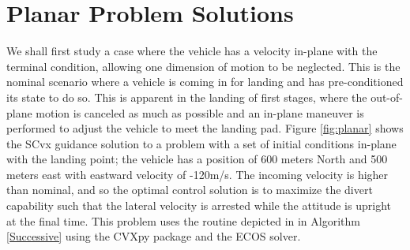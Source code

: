 \documentclass[conf]{new-aiaa}
\begin{document}
\section{Planar Problem Solutions}
We shall first study a case where the vehicle has a velocity in-plane with the terminal condition, allowing one dimension of motion to be neglected. This is the nominal scenario where a vehicle is coming in for landing and has pre-conditioned its state to do so. This is apparent in the landing of first stages, where the out-of-plane motion is canceled as much as possible and an in-plane maneuver is performed to adjust the vehicle to meet the landing pad. Figure \ref{fig:planar} shows the SCvx guidance solution to a problem with a set of initial conditions in-plane with the landing point; the vehicle has a position of 600 meters North and 500 meters east with eastward velocity of -120m/s. The incoming velocity is higher than nominal, and so the optimal control solution is to maximize the divert capability such that the lateral velocity is arrested while the attitude is upright at the final time. This problem uses the routine depicted in in Algorithm \ref{Successive} using the CVXpy package and the ECOS \cite{domahidi2013ecos} solver.
\end{document}
